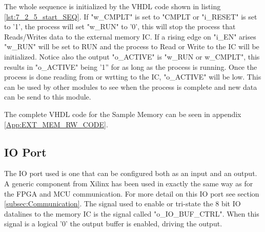The whole sequence is initialized by the VHDL code shown in listing \ref{lst:7_2_5_start_SEQ}. If "w\_CMPLT" is set to "CMPLT or "i\_RESET" is set to '1', the process will set "w\_RUN" to '0', this will stop the process that Reads/Writes data to the external memory IC. If a rising edge on "i\_EN" arises "w\_RUN" will be set to RUN and the process to Read or Write to the IC will be initialized. Notice also the output "o\_ACTIVE" is "w\_RUN or w\_CMPLT", this results in "o\_ACTIVE" being '1'' for as long as the process is running. Once the process is done reading from or wrtting to the IC, "o\_ACTIVE" will be low. This can be used by other modules to see when the process is complete and new data can be send to this module.

 

The complete VHDL code for the Sample Memory can be seen in appendix \ref{App:EXT_MEM_RW_CODE}.

\subsection*{IO Port}
The IO port used is one that can be configured both as an input and an output. A generic component from Xilinx has been used in exactly the same way as for the FPGA and MCU communication. For more detail on this IO port see section \ref{subsec:Communication}. The signal used to enable or tri-state the 8 bit IO datalines to the memory IC is the signal called "o\_IO\_BUF\_CTRL". When this signal is a logical '0' the output buffer is enabled, driving the output.